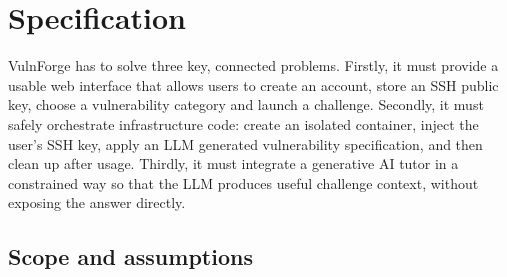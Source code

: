 %
%

\section{Specification}\label{sec:spec}

VulnForge has to solve three key, connected problems. Firstly, it must provide a usable web interface that allows users to create an account, store an SSH public key, choose a vulnerability category and launch a challenge. Secondly, it must safely orchestrate infrastructure code: create an isolated container, inject the user's SSH key, apply an LLM generated vulnerability specification, and then clean up after usage. Thirdly, it must integrate a generative AI tutor in a constrained way so that the LLM produces useful challenge context, without exposing the answer directly. 

\subsection{Scope and assumptions}\label{sec:scope}

